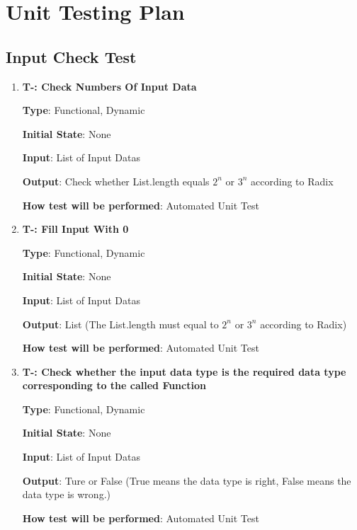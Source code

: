\documentclass[12pt, titlepage]{article}
\newcounter{tnum}
\begin{document}
\section{Unit Testing Plan}
\subsection{Input Check Test}

\begin{enumerate}

\item{\textbf{T-\thetnum \label{CNI}: Check Numbers Of Input Data}}

\textbf {Type}: Functional, Dynamic
					
\textbf {Initial State}: None
					
\textbf {Input}: List of Input Datas
					
\textbf {Output}: Check whether List.length equals $2^n$ or $3^n$ according to Radix
					
\textbf {How test will be performed}: Automated Unit Test


\item{\textbf{T-\thetnum \label{FZ}: Fill Input With 0}}

\textbf {Type}: Functional, Dynamic
					
\textbf {Initial State}: None
					
\textbf {Input}: List of Input Datas 
					
\textbf {Output}: List (The List.length must equal to $2^n$ or $3^n$ according to Radix)
					
\textbf {How test will be performed}:  Automated Unit Test


\item{\textbf{T-\thetnum \label{DTC}: Check whether the input data type is the required data type corresponding to the called Function}}

\textbf {Type}: Functional, Dynamic
					
\textbf {Initial State}: None
					
\textbf {Input}:  List of Input Datas
					
\textbf {Output}: Ture or False (True means the data type is right, False means the data type is wrong.)
					
\textbf {How test will be performed}:  Automated Unit Test


\end{enumerate}		
\end{document}
